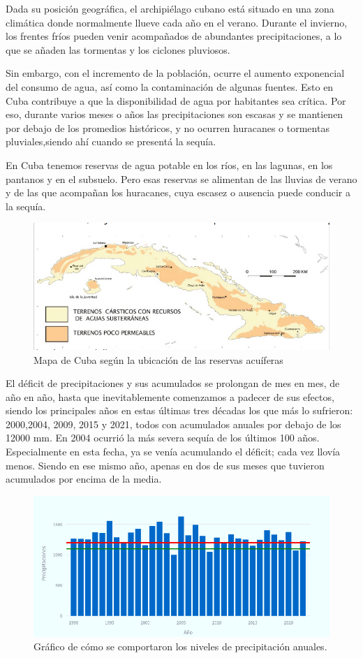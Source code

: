 \documentclass[12pt]{article}
\begin{document}
	\newpage
    Dada su posición geográfica, el archipiélago cubano está situado en una zona climática donde normalmente llueve cada año en el verano. Durante el invierno, los frentes fríos pueden venir acompañados de abundantes precipitaciones, a lo que se añaden las tormentas y los ciclones pluviosos.
    \par\vspace{4mm}
    Sin embargo, con el incremento de la población, ocurre el aumento exponencial del consumo de agua, así como la contaminación de algunas fuentes. Esto en Cuba contribuye a que la disponibilidad de agua por habitantes sea crítica. Por eso, durante varios meses o años las precipitaciones son escasas y se mantienen por debajo de los promedios históricos, y no ocurren huracanes o tormentas pluviales,siendo ahí cuando se presentá la sequía.
    \par\vspace{4mm}
    En Cuba tenemos reservas de agua potable en los ríos, en las lagunas, en los pantanos y en el subsuelo. Pero esas reservas se alimentan de las lluvias de verano y de las que acompañan los huracanes, cuya escasez o ausencia puede conducir a la sequía.
    \begin{figure}
		\centering
		\includegraphics[width=0.7\linewidth]{./Report/images/10.png}
		\caption{Mapa de Cuba según la ubicación de las reservas acuíferas}
	\end{figure}
	\newpage
    El déficit de precipitaciones y sus acumulados se prolongan de mes en mes, de año en año, hasta que inevitablemente comenzamos a padecer de sus efectos, siendo los principales años en estas últimas tres décadas los que más lo sufrieron:  2000,2004, 2009, 2015 y 2021, todos con acumulados anuales por debajo de los 12000 mm. En 2004 ocurrió la más severa sequía de los últimos 100 años. Especialmente en esta fecha, ya se venía acumulando el déficit; cada vez llovía menos. Siendo en ese mismo año, apenas en dos de sus meses que tuvieron acumulados por encima de la media.
	\par\vspace{2pt}
	\begin{figure}
		\centering
		\includegraphics[width=0.8\linewidth]{./Report/images/1.png}
		\caption{Gráfico de cómo se comportaron los niveles de precipitación anuales.}
	\end{figure}
\end{document}
